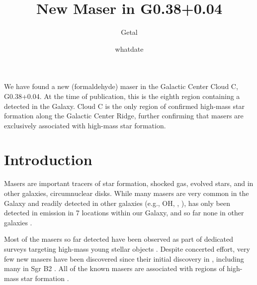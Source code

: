 \documentclass{aa}
\begin{document}
 


   \title{New \formaldehyde Maser in G0.38+0.04}

   \subtitle{}

   \author{Getal}


   \date{whatdate}

 
  \abstract
   {We have found a new \formaldehyde \oneone (formaldehyde) maser in the Galactic
Center Cloud C, G0.38+0.04.  At the time of publication, this is the eighth
region containing a \formaldehyde detected in the Galaxy.  Cloud C is the only
region of confirmed high-mass star formation along the Galactic Center Ridge,
further confirming that \formaldehyde masers are exclusively associated with high-mass
star formation.
}

   \keywords{  }

   \maketitle




\section{Introduction}
Masers are important tracers of star formation, shocked gas, evolved stars, and
in other galaxies, circumnuclear disks.  While many masers are very common in
the Galaxy and readily detected in other galaxies (e.g., OH, \methanol,
\water), \formaldehyde has only been detected in emission in 7 locations within
our Galaxy, and so far none in other galaxies \citep{Araya2007c,Mangum2008a}.

Most of the \formaldehyde masers so far detected have been observed as part of
dedicated surveys targeting high-mass young stellar objects
\citep{Araya2004a,Araya2007b,Araya2008a}.  Despite concerted effort, very few
new masers have been discovered since their initial discovery in
\citet{Forster1980a}, including many in Sgr B2
\citep{Whiteoak1983a,Mehringer1994b}.  All of the known \formaldehyde masers
are associated with regions of high-mass star formation
\citep{Pratap1994a,Araya2004a,Araya2007b,Araya2008a}.
\end{document}
